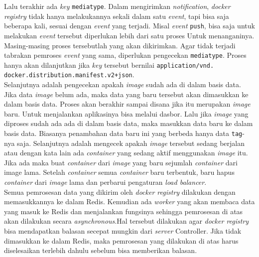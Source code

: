             \indent Lalu terakhir ada \textit{key} \texttt{mediatype}. Dalam  mengirimkan \textit{notification}, \textit{docker registry} tidak hanya melakukannya sekali dalam satu \textit{event}, tapi bisa saja beberapa kali, sesuai dengan \textit{event} yang terjadi. Misal \textit{event} \texttt{push}, bisa saja untuk melakukan \textit{event} tersebut diperlukan lebih dari satu proses  Untuk menanganinya. Masing-masing proses tersebutlah yang akan dikirimkan. Agar tidak terjadi tabrakan pemroses \textit{event} yang sama, diperlukan pengecekan \texttt{mediatype}. Proses hanya akan dilanjutkan jika \textit{key} tersebut bernilai \texttt{application/vnd. docker.distribution.manifest.v2+json}. \\
            \indent Selanjutnya adalah pengecekan apakah \textit{image} sudah ada di dalam basis data. Jika data \textit{image} belum ada, maka data yang baru tersebut akan dimasukkan ke dalam basis data. Proses akan berakhir sampai disana jika itu merupakan \textit{image} baru. Untuk menjalankan aplikasinya bisa melalui dasbor. Lalu jika \textit{image} yang diproses sudah ada ada di dalam basis data, maka masukkan data baru ke dalam basis data. Biasanya penambahan data baru ini yang berbeda hanya data \texttt{tag}-nya saja. Selanjutnya adalah mengecek apakah \textit{image} tersebut sedang berjalan atau dengan kata lain ada \textit{container} yang sedang aktif menggunakan \textit{image} itu. Jika ada maka buat \textit{container} dari \textit{image} yang baru sejumlah \textit{container} dari image lama. Setelah \textit{container} semua \textit{container} baru terbentuk, baru hapus \textit{container} dari \textit{image} lama dan perbarui pengaturan \textit{load balancer}. \\
            \indent Semua pemrosesan data yang dikirim oleh \textit{docker registry} dilakukan dengan memasukkannya ke dalam Redis. Kemudian ada \textit{worker} yang akan membaca data yang masuk ke Redis dan menjalankan fungsinya sehingga pemrosesan di atas akan dilakukan secara \textit{asynchronous}.Hal tersebut dilakukan agar \textit{docker registry} bisa mendapatkan balasan secepat mungkin dari \textit{server} Controller. Jika tidak dimasukkan ke dalam Redis, maka pemrosesan yang dilakukan di atas harus diselesaikan terlebih dahulu sebelum bisa memberikan balasan.
            
